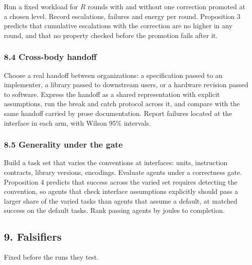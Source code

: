 \documentclass[
  10pt,
]{article}
\begin{document}
Run a fixed workload for \(R\) rounds with and without one correction
promoted at a chosen level. Record escalations, failures and energy per
round. Proposition 3 predicts that cumulative escalations with the
correction are no higher in any round, and that no property checked
before the promotion fails after it.

\subsubsection{8.4 Cross-body handoff}\label{cross-body-handoff}

Choose a real handoff between organizations: a specification passed to
an implementer, a library passed to downstream users, or a hardware
revision passed to software. Express the handoff as a shared
representation with explicit assumptions, run the break and catch
protocol across it, and compare with the same handoff carried by prose
documentation. Report failures located at the interface in each arm,
with Wilson 95\% intervals.

\subsubsection{8.5 Generality under the
gate}\label{generality-under-the-gate}

Build a task set that varies the conventions at interfaces: units,
instruction contracts, library versions, encodings. Evaluate agents
under a correctness gate. Proposition 4 predicts that success across the
varied set requires detecting the convention, so agents that check
interface assumptions explicitly should pass a larger share of the
varied tasks than agents that assume a default, at matched success on
the default tasks. Rank passing agents by joules to completion.

\subsection{9. Falsifiers}\label{falsifiers}

Fixed before the runs they test.
\end{document}
